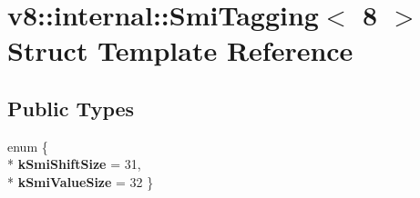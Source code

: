 \hypertarget{structv8_1_1internal_1_1_smi_tagging_3_018_01_4}{}\section{v8\+:\+:internal\+:\+:Smi\+Tagging$<$ 8 $>$ Struct Template Reference}
\label{structv8_1_1internal_1_1_smi_tagging_3_018_01_4}
\subsection*{Public Types}
\begin{DoxyCompactItemize}
\item 
enum \{ \\*
{\bfseries k\+Smi\+Shift\+Size} = 31, 
\\*
{\bfseries k\+Smi\+Value\+Size} = 32
 \}\hypertarget{structv8_1_1internal_1_1_smi_tagging_3_018_01_4_aca1e57809e36a53b790ee0480324fb7b}{}\label{structv8_1_1internal_1_1_smi_tagging_3_018_01_4_aca1e57809e36a53b790ee0480324fb7b}

\end{DoxyCompactItemize}
